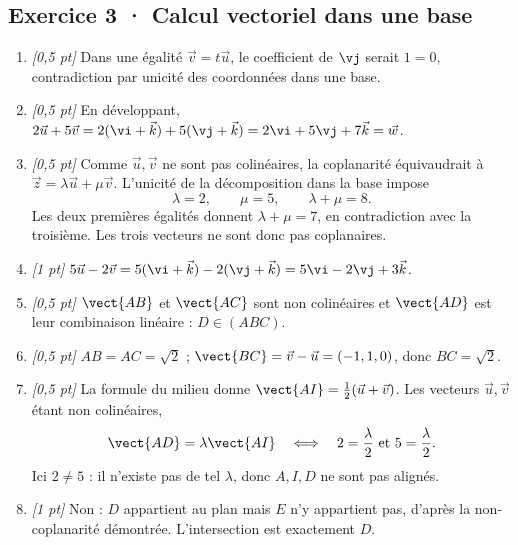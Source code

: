 \subsection*{Exercice 3 · Calcul vectoriel dans une base}\begin{enumerate}

\item \textit{[0,5 pt]} Dans une égalité $\vec v=t\vec u$, le coefficient de $\vj $ serait $1=0$, contradiction par unicité des coordonnées dans une base.

\item \textit{[0,5 pt]} En développant, $2\vec u+5\vec v=2(\vi +\vec k)+5(\vj +\vec k)=2\vi +5\vj +7\vec k=\vec w$.

\item \textit{[0,5 pt]} Comme $\vec u,\vec v$ ne sont pas colinéaires, la coplanarité équivaudrait à $\vec z=\lambda\vec u+\mu\vec v$. L'unicité de la décomposition dans la base impose
\[\lambda=2,\qquad\mu=5,\qquad\lambda+\mu=8.\]
Les deux premières égalités donnent $\lambda+\mu=7$, en contradiction avec la troisième. Les trois vecteurs ne sont donc pas coplanaires.

\item \textit{[1 pt]} $5\vec u-2\vec v=5(\vi +\vec k)-2(\vj +\vec k)=5\vi -2\vj +3\vec k$.

\item \textit{[0,5 pt]} $\vect{AB}$ et $\vect{AC}$ sont non colinéaires et $\vect{AD}$ est leur combinaison linéaire : $D\in(ABC)$.

\item \textit{[0,5 pt]} $AB=AC=\sqrt2$ ; $\vect{BC}=\vec v-\vec u=(-1,1,0)$, donc $BC=\sqrt2$.

\item \textit{[0,5 pt]} La formule du milieu donne $\vect{AI}=\frac12(\vec u+\vec v)$. Les vecteurs $\vec u,\vec v$ étant non colinéaires,
\[\vect{AD}=\lambda\vect{AI}\quad\Longleftrightarrow\quad 2=\frac{\lambda}{2}\ \text{et}\ 5=\frac{\lambda}{2}.\]
Ici $2\ne 5$ : il n'existe pas de tel $\lambda$, donc $A,I,D$ ne sont pas alignés.

\item \textit{[1 pt]} Non : $D$ appartient au plan mais $E$ n'y appartient pas, d'après la non-coplanarité démontrée. L'intersection est exactement $D$.

\end{enumerate}

